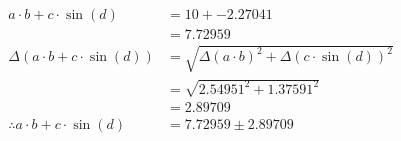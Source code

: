 \documentclass[a4paper]{article}
\begin{document}
\begin{align*}
a \cdot b + c \cdot \sin \left( d \right) &= 10 + -2.27041 \\
&= 7.72959 \\[4mm]
\Delta \left( a \cdot b + c \cdot \sin \left( d \right) \right) &= \sqrt{ \Delta \left( a \cdot b \right) ^ { 2 } + \Delta \left( c \cdot \sin \left( d \right) \right) ^ { 2 }} \\
&= \sqrt{ 2.54951 ^ { 2 } + 1.37591 ^ { 2 }} \\
&= 2.89709\\[4mm]
\therefore a \cdot b + c \cdot \sin \left( d \right) &= 7.72959 \pm 2.89709
\end{align*}
\end{document}
